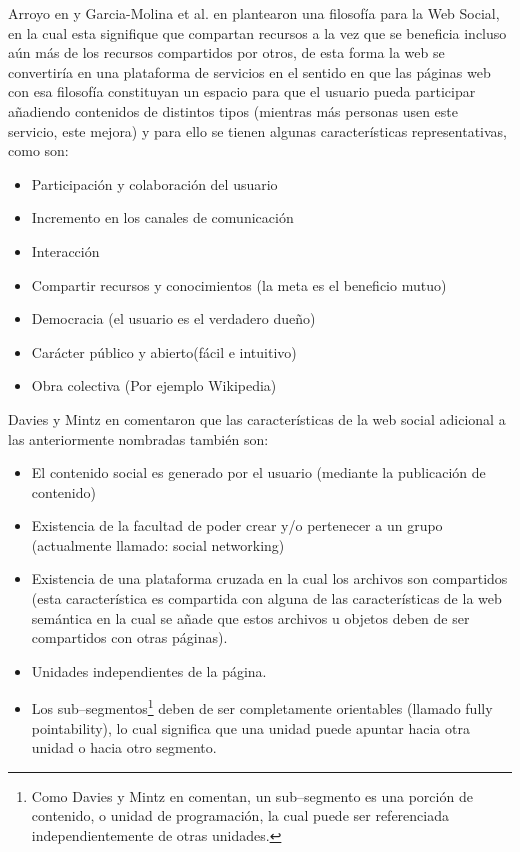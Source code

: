 \documentclass[oneside,12pt,a4paper]{memoir}%
\begin{document}
	Arroyo en \cite{Arroyo2007} y Garcia-Molina et al. en \cite{Heymann2007}
	plantearon una filosof\'ia para la Web Social, en la cual esta signifique
	que compartan recursos a la vez que se beneficia incluso a\'un m\'as de los
	recursos compartidos por otros, de esta forma la web se convertir\'ia en una
	plataforma de servicios en el sentido en que las p\'aginas web con esa
	filosof\'ia constituyan un espacio para que el usuario pueda participar
	a\~nadiendo contenidos de distintos tipos (mientras m\'as personas usen este
	servicio, este mejora) y para ello se tienen algunas caracter\'isticas
	representativas, como son:
	
	\begin{itemize}
	  \item Participaci\'on y colaboraci\'on del usuario
	  \item Incremento en los canales de comunicaci\'on
	  \item Interacci\'on
	  \item Compartir recursos y conocimientos (la meta es el beneficio mutuo)
	  \item Democracia (el usuario es el verdadero due\~no)
	  \item Car\'acter p\'ublico y abierto(f\'acil e intuitivo)
	  \item Obra colectiva (Por ejemplo Wikipedia)
	\end{itemize}
	
	Davies y Mintz en \cite{Davies2009} comentaron que las caracter\'isticas
	de la web social adicional a las anteriormente nombradas tambi\'en son:
	
	\begin{itemize}
	  \item El contenido social es generado por el usuario (mediante la
	  publicaci\'on de contenido)
	  \item Existencia de la facultad de poder crear y/o pertenecer a un grupo
	  (actualmente llamado: social networking)
	  \item Existencia de una plataforma cruzada en la cual los archivos son
	  compartidos (esta caracter\'istica es compartida con alguna de las
	  caracter\'isticas de la web sem\'antica en la cual se a\~nade que estos archivos
	  u objetos deben de ser compartidos con otras p\'aginas).
	  \item Unidades independientes de la p\'agina.
	  \item Los sub--segmentos\footnote{Como Davies y Mintz en \cite{Davies2009}
	  comentan, un sub--segmento es una porci\'on de contenido, o unidad de
	  programaci\'on, la cual puede ser referenciada independientemente de otras
	  unidades.} deben de ser completamente orientables (llamado fully
	  pointability), lo cual significa que una unidad puede apuntar hacia otra
	  unidad o hacia otro segmento.
	\end{itemize}
	
\end{document}

